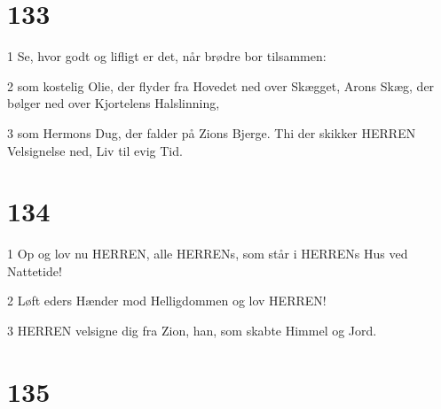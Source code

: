 \chapter{133}

\par 1 Se, hvor godt og lifligt er det, når brødre bor tilsammen:
\par 2 som kostelig Olie, der flyder fra Hovedet ned over Skægget, Arons Skæg, der bølger ned over Kjortelens Halslinning,
\par 3 som Hermons Dug, der falder på Zions Bjerge. Thi der skikker HERREN Velsignelse ned, Liv til evig Tid.

\chapter{134}

\par 1 Op og lov nu HERREN, alle HERRENs, som står i HERRENs Hus ved Nattetide!
\par 2 Løft eders Hænder mod Helligdommen og lov HERREN!
\par 3 HERREN velsigne dig fra Zion, han, som skabte Himmel og Jord.

\chapter{135}

